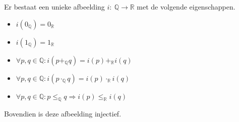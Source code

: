 \documentclass[main.tex]{subfiles}
\begin{document}
\begin{pr}
  Er bestaat een unieke afbeelding $i:\ \mathbb{Q} \rightarrow \mathbb{R}$ met de volgende eigenschappen.
  \begin{itemize}
  \item $i(0_{\mathbb{Q}}) = 0_{\mathbb{R}}$
  \item $i(1_{\mathbb{Q}}) = 1_{\mathbb{R}}$
  \item $\forall p,q \in \mathbb{Q}: i(p+_{\mathbb{Q}}q) = i(p) +_{\mathbb{R}} i(q)$
  \item $\forall p,q \in \mathbb{Q}: i(p\cdot_{\mathbb{Q}} q) = i(p) \cdot_{\mathbb{R}} i(q)$
  \item $\forall p,q \in \mathbb{Q}: p \le_{\mathbb{Q}} q \Rightarrow i(p) \le_{\mathbb{R}} i(q)$
  \end{itemize}
  Bovendien is deze afbeelding injectief.


\end{pr}
\end{document}
